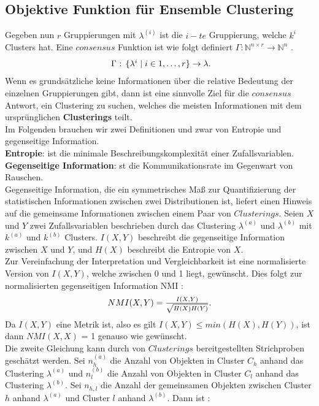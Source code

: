 \documentclass[runningheads]{llncs}
\begin{document}
\subsection{Objektive Funktion für Ensemble Clustering}
Gegeben nun $r$ Gruppierungen mit $\lambda^{(i)}$ ist die $i-te$ Gruppierung, welche $k^{i}$ Clusters hat. Eine $consensus$ Funktion ist wie folgt definiert $\Gamma:\mathbb{N}^{n \times r} \rightarrow \mathbb{N}^{n}$ \cite{strehl2002cluster}.
\begin{equation} 
\centerline{ $\Gamma$ : $\{\lambda^{i} \mid i \in {1, \ldots, r}\} \rightarrow \lambda$.}
\end{equation}
Wenn es grundsätzliche keine Informationen über die relative Bedeutung der einzelnen Gruppierungen gibt, dann ist eine sinnvolle Ziel für die $consensus$ Antwort, ein Clustering zu suchen, welches die meisten Informationen mit dem ursprünglichen \textbf{Clusterings} teilt.  \\
Im Folgenden brauchen wir zwei Definitionen und zwar von Entropie und gegenseitige Information.\\
\textbf{Entropie}: ist die minimale Beschreibungskomplexität einer Zufallsvariablen.\\
\textbf{Gegenseitige Information}: st die Kommunikationsrate im Gegenwart von Rauschen.\\
Gegenseitige Information, die ein symmetrisches Maß zur Quantifizierung der statistischen Informationen zwischen zwei Distributionen ist, liefert einen Hinweis auf die gemeinsame Informationen zwischen einem Paar von $Clusterings$. Seien $X$ und $Y$ zwei Zufallsvariablen beschrieben durch das Clustering $\lambda^{(a)}$ und $\lambda^{(b)}$ mit $k^{(a)}$ und $k^{(b)}$ Clusters. $I(X,Y)$ beschreibt die gegenseitige Information zwischen $X$ und $Y$, und $H(X)$ beschreibt die Entropie von $X$.\\
Zur Vereinfachung der Interpretation und Vergleichbarkeit ist eine normalisierte Version von $I(X,Y)$, welche zwischen 0 und 1 liegt, gewünscht. Dies folgt zur normalisierten gegenseitigen Information NMI \cite{strehl2002cluster}:
\begin{equation} 
\centerline{$NMI(X,Y) = \frac{I(X,Y)}{\sqrt{H(X)H(Y)}}.$}
\end{equation}
Da $I(X,Y)$ eine Metrik ist, also es gilt $I(X,Y) \leq min(H(X), H(Y))$, ist dann $NMI(X,X)$ = 1 genauso wie gewünscht.\\
Die zweite Gleichung kann durch von $Clusterings$ bereitgestellten Strichproben geschätzt werden. Sei $n_{h}^{(a)}$ die Anzahl von Objekten in Cluster $C_{h}$ anhand das Clustering $\lambda^{(a)}$ und $n_{l}^{(b)}$ die Anzahl von Objekten in Cluster $C_{l}$ anhand das Clustering $\lambda^{(b)}$. Sei $n_{h,l}$ die Anzahl der gemeinsamen Objekten zwischen Cluster $h$ anhand $\lambda^{(a)}$ und Cluster $l$ anhand $\lambda^{(b)}$. Dann ist \cite{strehl2002cluster}:
\end{document}
